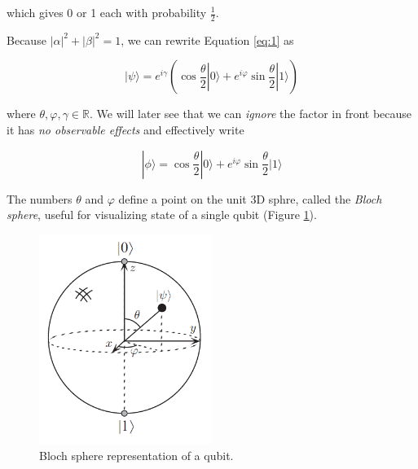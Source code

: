 \documentclass{article}
\newcommand{\bracket}[1]{|#1\rangle}
\begin{document}
which gives 0 or 1 each with probability $\frac{1}{2}$.

Because $|\alpha|^2 + |\beta|^2 = 1$, we can rewrite Equation \ref{eq:1} as

\begin{equation} \label{eq:3}
\bracket{\psi} = e^{i \gamma} \left(\cos \frac{\theta}{2} \bracket{0} + e^{i \varphi} \sin \frac{\theta}{2} \bracket{1} \right)
\end{equation}

where $\theta, \varphi, \gamma \in \mathbb{R}$. We will later see that we can \textit{ignore} the factor in front because it has \textit{no observable effects} and effectively write

\begin{equation} \label{eq:4}
\bracket{\phi} = \cos \frac{\theta}{2} \bracket{0} + e^{i \varphi} \sin \frac{\theta}{2} \bracket{1}
\end{equation}

The numbers $\theta$ and $\varphi$ define a point on the unit 3D sphre, called the \textit{Bloch sphere}, useful for visualizing state of a single qubit (Figure \ref{fig:1}).

\begin{figure} \label{fig:1}
	\centering
	\includegraphics[width=0.5\textwidth]{bloch_sphere.png}
	\caption{Bloch sphere representation of a qubit.}
\end{figure}
\end{document}
